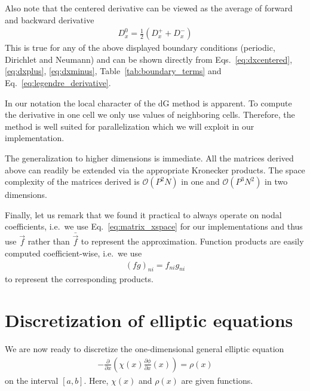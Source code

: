 Also note that the centered derivative can be viewed as the average of forward
and backward derivative
\begin{align}
    D^0_{x} = \frac{1}{2}\left( D^+_x + D^-_x\right)
\end{align}
This is true for any of the above displayed boundary conditions (periodic,
Dirichlet and Neumann) and can be shown directly from Eqs.~\eqref{eq:dxcentered},
\eqref{eq:dxplus}, \eqref{eq:dxminus}, Table~\eqref{tab:boundary_terms}
and Eq.~\eqref{eq:legendre_derivative}.

In our notation the local character of the dG method is apparent.
To compute the derivative in one cell we only use values of neighboring
cells. Therefore, the method is well suited for parallelization which we
will exploit in our implementation.

The generalization to higher dimensions is immediate.
All the
matrices derived above can readily be extended via the appropriate Kronecker products.
The space complexity of 
the matrices derived is $\mathcal{O}(P^2 N)$ in one and $\mathcal{O}(P^3N^2)$ in two dimensions.

Finally, let us remark that we found it practical to always operate on nodal
coefficients, i.e.~we use Eq.~\eqref{eq:matrix_xspace}
for our implementations and thus use $\vec f$ rather than $\bar{\vec f}$ to represent the approximation. Function products are easily computed coefficient-wise, i.e.~we use
\begin{align}
    (fg)_{ni}=f_{ni}g_{ni}
    \label{}
\end{align}
to represent the corresponding products.

\section{Discretization of elliptic equations} \label{sec:elliptic}
We are now ready to discretize the one-dimensional general elliptic equation 
\begin{align}
    -\frac{\partial}{\partial x}\left( \chi(x)\frac{\partial \phi}{\partial x}(x)\right) = \rho(x)
    \label{eq:elliptic}
\end{align}
on the interval $[a,b]$. Here, $\chi(x)$ and $\rho(x)$ are given functions.

